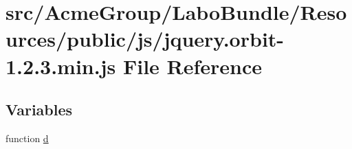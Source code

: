 \hypertarget{jquery_8orbit-1_82_83_8min_8js}{\section{src/\+Acme\+Group/\+Labo\+Bundle/\+Resources/public/js/jquery.orbit-\/1.2.3.min.\+js File Reference}
\label{jquery_8orbit-1_82_83_8min_8js}
}
\subsection*{Variables}
\begin{DoxyCompactItemize}
\item 
function \hyperlink{jquery_8orbit-1_82_83_8min_8js_a36541169dfff685f807208881a4f0021}{d}
\end{DoxyCompactItemize}


